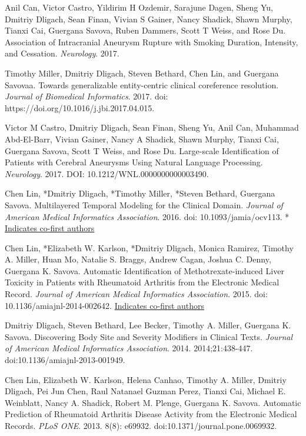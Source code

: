 \documentclass[letterpaper]{article}
\renewenvironment{itemize}{
  \begin{list}{}{
    \setlength{\leftmargin}{1.5em}
  }
}{
  \end{list}
}
\begin{document}
\begin{itemize}
\item Anil Can, Victor Castro, Yildirim H Ozdemir, Sarajune Dagen, Sheng Yu, Dmitriy Dligach, Sean Finan, Vivian S Gainer, Nancy Shadick, Shawn Murphy, Tianxi Cai, Guergana Savova, Ruben Dammers, Scott T Weiss, and Rose Du. Association of Intracranial Aneurysm Rupture with Smoking Duration, Intensity, and Cessation. \emph{Neurology}. 2017.
\item Timothy Miller, Dmitriy Dligach, Steven Bethard, Chen Lin, and Guergana Savovaa. Towards generalizable entity-centric clinical coreference resolution. \emph{Journal of Biomedical Informatics}. 2017. doi: https://doi.org/10.1016/j.jbi.2017.04.015.
\item Victor M Castro, Dmitriy Dligach, Sean Finan, Sheng Yu, Anil Can, Muhammad Abd-El-Barr, Vivian Gainer, Nancy A Shadick, Shawn Murphy, Tianxi Cai, Guergana Savova, Scott T Weiss, and Rose Du. Large-scale Identification of Patients with Cerebral Aneurysms Using Natural Language Processing. \emph{Neurology}. 2017. DOI: 10.1212/WNL.0000000000003490.
\item *Chen Lin, *Dmitriy Dligach, *Timothy Miller, *Steven Bethard, Guergana Savova. Multilayered Temporal Modeling for the Clinical Domain. \emph{Journal of American Medical Informatics Association}. 2016. doi: 10.1093/jamia/ocv113. * \underline{Indicates co-first authors}
\item *Chen Lin, *Elizabeth W. Karlson, *Dmitriy Dligach, Monica Ramirez, Timothy A. Miller, Huan Mo, Natalie S. Braggs, Andrew Cagan, Joshua C. Denny, Guergana K. Savova. Automatic Identification of Methotrexate-induced Liver Toxicity in Patients with Rheumatoid Arthritis from the Electronic Medical Record. \emph{Journal of American Medical Informatics Association}. 2015. doi: 10.1136/amiajnl-2014-002642. \newline * \underline{Indicates co-first authors}
\item Dmitriy Dligach, Steven Bethard, Lee Becker, Timothy A. Miller, Guergana K. Savova. Discovering Body Site and Severity Modifiers in Clinical Texts. \emph{Journal of American Medical Informatics Association}. 2014. 2014;21:438-447. doi:10.1136/amiajnl-2013-001949.
\item Chen Lin, Elizabeth W. Karlson, Helena Canhao, Timothy A. Miller, Dmitriy Dligach, Pei Jun Chen, Raul Natanael Guzman Perez, Tianxi Cai, Michael E. Weinblatt, Nancy A. Shadick, Robert M. Plenge, Guergana K. Savova. Automatic Prediction of Rheumatoid Arthritis Disease Activity from the Electronic Medical Records. \emph{PLoS ONE}. 2013. 8(8): e69932. doi:10.1371/journal.pone.0069932.

\end{itemize}
\end{document}
